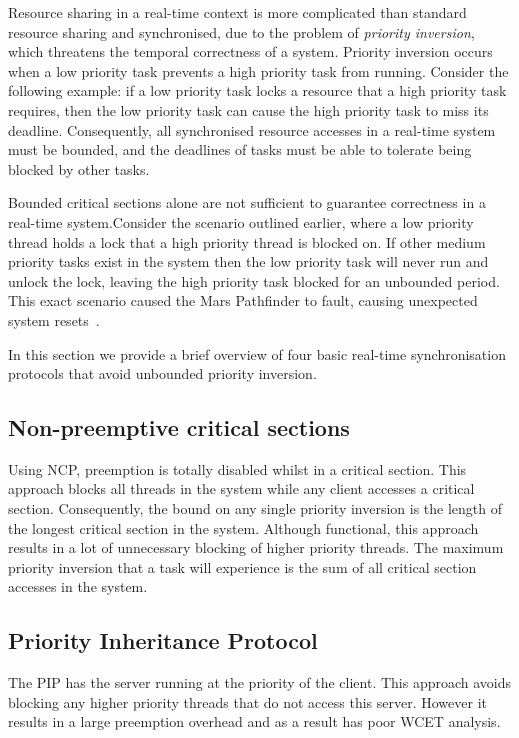 Resource sharing in a real-time context is more complicated than standard resource sharing and
synchronised, due to the problem of \emph{priority inversion}, which threatens the temporal
correctness of a system.  Priority inversion occurs when a low priority task prevents a high
priority task from running.  Consider the following example: if a low priority task locks a resource
that a high priority task requires, then the low priority task can cause the high priority task to
miss its deadline.  Consequently, all synchronised resource accesses in a real-time system must be
bounded, and the deadlines of tasks must be able to tolerate being blocked by other tasks.

Bounded critical sections alone are not sufficient to guarantee correctness in a real-time
system.Consider the scenario outlined earlier, where a low priority thread holds a lock that a high
priority thread is blocked on.  If other medium priority tasks exist in the system then the low
priority task will never run and unlock the lock, leaving the high priority task blocked for an
unbounded period.  This exact scenario caused the Mars Pathfinder to fault, causing unexpected
system resets~\citep{Mars_Pathfinder}.

In this section we provide a brief overview of four basic real-time synchronisation protocols that
avoid unbounded priority inversion.

\subsection{Non-preemptive critical sections}

Using \gls{NCP}, preemption is totally disabled whilst in a critical section.
This approach blocks all threads in the system while any client accesses a critical section.
Consequently, the bound on any single priority inversion is the length of the longest critical section in the system.
Although functional, this approach results in a lot of unnecessary blocking of higher priority threads.
The maximum priority inversion that a task will experience is the sum of all critical section accesses in the system.

\subsection{Priority Inheritance Protocol}
\label{sec:pip}

The \gls{PIP} has the server running at the priority of the client.
This approach avoids blocking any higher priority threads that do not access this server.
However it results in a large preemption overhead and as a result has poor WCET analysis.

